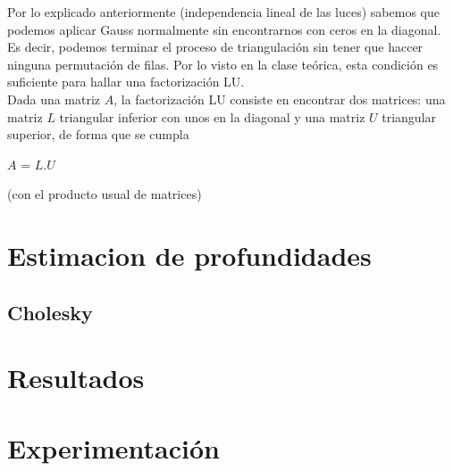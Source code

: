 Por lo explicado anteriormente (independencia lineal de las luces) sabemos que podemos aplicar Gauss normalmente sin encontrarnos con ceros en la diagonal. Es decir, podemos terminar el proceso de triangulación sin tener que haccer ninguna permutación de filas. Por lo visto en la clase teórica, esta condición es suficiente para hallar una factorización LU. \\

Dada una matriz $A$, la factorización LU consiste en encontrar dos matrices: una matriz $L$ triangular inferior con unos en la diagonal y una matriz $U$ triangular superior, de forma que se cumpla

\begin{center}
$A$ = $L$.$U$
\end{center}


 (con el producto usual de matrices)






\section{Estimacion de profundidades}

\subsection{Cholesky}

\section{Resultados}


\section{Experimentación}





